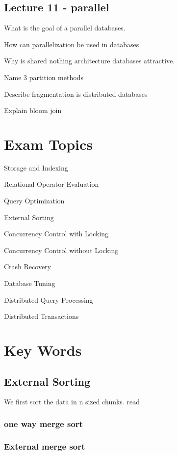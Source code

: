 \documentclass[a4paper,10pt,titlepage]{report}
\begin{document}
    
\subsection{Lecture 11 - parallel}

	What is the goal of a parallel databases.
    
    How can parallelization be used in databases
    
    Why is shared nothing architecture databases attractive.
    
   	Name 3 partition methods
    
    Describe fragmentation is distributed databases
    
    Explain bloom join
    
    
    
    
\newpage    
\section{Exam Topics}

Storage and Indexing

Relational Operator Evaluation

Query Optimization

External Sorting

Concurrency Control with Locking

Concurrency Control without Locking

Crash Recovery

Database Tuning

Distributed Query Processing

Distributed Transactions









\section{Key Words}


\subsection{External Sorting}
We first sort the data in n sized chunks. read 
\subsubsection{one way merge sort}
\subsubsection{External merge sort}
\end{document}
